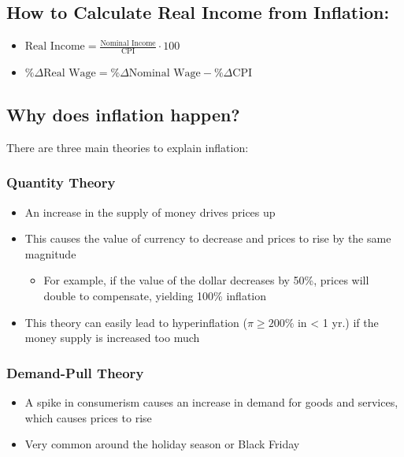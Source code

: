 \documentclass[
  letterpaper,
  DIV=11,
  numbers=noendperiod]{scrartcl}
\providecommand{\tightlist}{%
  \setlength{\itemsep}{0pt}\setlength{\parskip}{0pt}}\usepackage{longtable,booktabs,array}
\begin{document}
\subsection{How to Calculate Real Income from
Inflation:}\label{how-to-calculate-real-income-from-inflation}

\begin{itemize}
\tightlist
\item
  \(\text{Real Income} = \frac{\text{Nominal Income}}{\text{CPI}}\cdot 100\)
\item
  \(\% \Delta \text{Real Wage} = \% \Delta \text{Nominal Wage} - \% \Delta \text{CPI}\)
\end{itemize}

\subsection{Why does inflation happen?}\label{why-does-inflation-happen}

There are three main theories to explain inflation:

\subsubsection{Quantity Theory}\label{quantity-theory}

\begin{itemize}
\tightlist
\item
  An increase in the supply of money drives prices up
\item
  This causes the value of currency to decrease and prices to rise by
  the same magnitude

  \begin{itemize}
  \tightlist
  \item
    For example, if the value of the dollar decreases by 50\%, prices
    will double to compensate, yielding 100\% inflation
  \end{itemize}
\item
  This theory can easily lead to hyperinflation (\(\pi \ge 200\%\) in
  \textless{} 1 yr.) if the money supply is increased too much
\end{itemize}

\subsubsection{Demand-Pull Theory}\label{demand-pull-theory}

\begin{itemize}
\tightlist
\item
  A spike in consumerism causes an increase in demand for goods and
  services, which causes prices to rise
\item
  Very common around the holiday season or Black Friday
\end{itemize}
\end{document}
